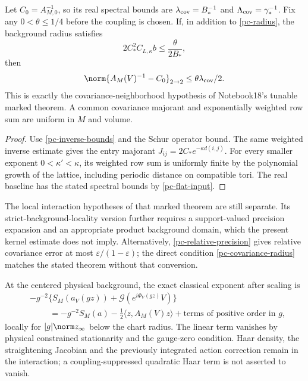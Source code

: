 \begin{corollary}
\label{pc-tunable-covariance}
Let $C_0=A_{M,0}^{-1}$, so its real spectral bounds are
$\lambda_{\rm cov}=B_*^{-1}$ and
$\Lambda_{\rm cov}=\gamma_*^{-1}$. Fix any
$0<\theta\le1/4$ before the coupling is chosen. If, in addition
to \eqref{pc-radius}, the background radius satisfies
\begin{equation}\label{pc-covariance-radius}
 2C_*^2C_{L,\kappa}b\le\frac{\theta}{2B_*},
\end{equation}
then
\begin{equation}\label{pc-covariance-close}
 \norm{A_M(V)^{-1}-C_0}_{2\to2}
       \le\theta\lambda_{\rm cov}/2.
\end{equation}
This is exactly the covariance-neighborhood hypothesis of
Notebook18's tunable marked theorem. A common covariance
majorant and exponentially weighted row sum are uniform in
$M$ and volume.
\end{corollary}
\begin{proof}
Use \eqref{pc-inverse-bounds} and the Schur operator bound.
The same weighted inverse estimate gives the entry majorant
$J_{ij}=2C_*e^{-\kappa d(i,j)}$. For every smaller exponent
$0<\kappa'<\kappa$, its weighted row sum is uniformly finite
by the polynomial growth of the lattice, including periodic
distance on compatible tori. The real baseline has the stated
spectral bounds by \eqref{pc-flat-input}.
\end{proof}
The local interaction hypotheses of that marked theorem are
still separate. Its strict-background-locality version further
requires a support-valued precision expansion and an appropriate
product background domain, which the present kernel estimate
does not imply. Alternatively,
\eqref{pc-relative-precision} gives relative covariance error
at most $\varepsilon/(1-\varepsilon)$; the direct condition
\eqref{pc-covariance-radius} matches the stated theorem without
that conversion.

At the centered physical background, the exact classical
exponent after scaling is
\begin{equation}\label{pc-scaled-exponent}
 \begin{split}
 &-g^{-2}\{S_M(a_V(gz))+\mathcal G(e^{i\Phi_V(gz)}V)\}\\
 &\hspace{1cm}=-g^{-2}S_M(a)-\tfrac12\langle z,A_M(V)z\rangle
                  +\text{terms of positive order in }g,
 \end{split}
\end{equation}
locally for $|g|\norm z_\infty$ below the chart radius. The
linear term vanishes by physical constrained stationarity and
the gauge-zero condition. Haar density, the straightening
Jacobian and the previously integrated action correction
remain in the interaction; a coupling-suppressed quadratic
Haar term is not asserted to vanish.

